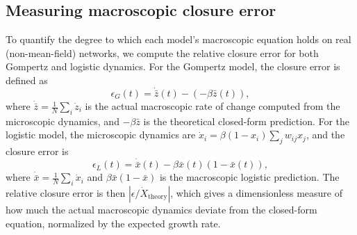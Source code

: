 \documentclass{article}
\begin{document}
\subsection{Measuring macroscopic closure error}

To quantify the degree to which each model's macroscopic equation holds on real (non-mean-field) networks, we compute the relative closure error for both Gompertz and logistic dynamics. For the Gompertz model, the closure error is defined as
\begin{equation}
\epsilon_G(t) = \dot{\bar{z}}(t) - (-\beta\bar{z}(t)),
\end{equation}
where $\dot{\bar{z}} = \frac{1}{N}\sum_i \dot{z}_i$ is the actual macroscopic rate of change computed from the microscopic dynamics, and $-\beta\bar{z}$ is the theoretical closed-form prediction. For the logistic model, the microscopic dynamics are $\dot{x}_i = \beta(1-x_i)\sum_j w_{ij}x_j$, and the closure error is
\begin{equation}
\epsilon_L(t) = \dot{\bar{x}}(t) - \beta\bar{x}(t)(1-\bar{x}(t)),
\end{equation}
where $\dot{\bar{x}} = \frac{1}{N}\sum_i \dot{x}_i$ and $\beta\bar{x}(1-\bar{x})$ is the macroscopic logistic prediction. The relative closure error is then $|\epsilon / \dot{X}_{\text{theory}}|$, which gives a dimensionless measure of how much the actual macroscopic dynamics deviate from the closed-form equation, normalized by the expected growth rate.
\end{document}
